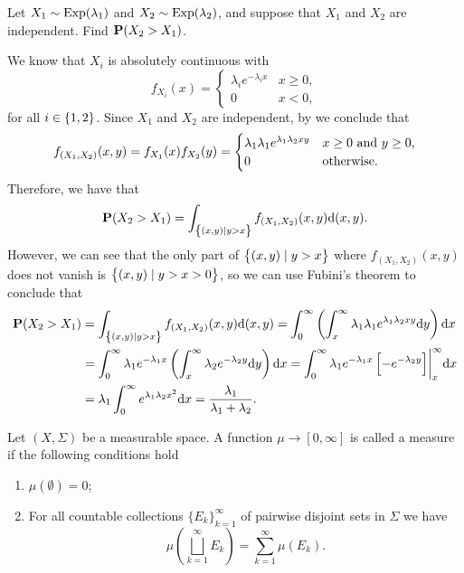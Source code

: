 \documentclass[11pt,a4paper]{article}
\begin{document}
\begin{exercise}
  Let $X_1 \sim \operatorname{Exp}(\lambda_1)$ and $X_2 \sim \operatorname{Exp}(\lambda_2)$,
  and suppose that $X_1$ and $X_2$ are independent.
  Find $\mathbf{P}(X_2 > X_1)$.
\end{exercise}
\begin{solution}
  We know that $X_i$ is absolutely continuous with
  \[
    f_{X_i}(x) =
    \begin{cases}
      \lambda_i e^{-\lambda_i x} &x \geq 0, \\
      0 &x < 0,
    \end{cases}
  \]
  for all $i \in \left\{1,2\right\}$.
  Since $X_1$ and $X_2$ are independent,
  by  we conclude that
  \[
    f_{(X_1,X_2)}(x,y) =
    f_{X_1}(x) f_{X_2}(y) =
    \begin{cases}
      \lambda_1 \lambda_1 e^{\lambda_1 \lambda_2 x y} &x \geq 0 \text{ and } y \geq 0, \\
      0 &\text{otherwise}.
    \end{cases}
  \]
  Therefore, we have that
  \[
    \mathbf{P}(X_2 > X_1) =
    \int_{\left\{(x,y) \mid y > x\right\}} f_{(X_1,X_2)}(x,y) \mathrm{d}(x,y).
  \]
  However, we can see that the only part of $\left\{(x,y) \mid y > x\right\}$
  where $f_{(X_1,X_2)}(x,y)$ does not vanish
  is $\left\{(x,y) \mid y > x > 0\right\}$,
  so we can use Fubini's theorem to conclude that
  \begin{align*}
    \Prob(X_2 > X_1) &=
    \int_{\set{(x,y) \mid y > x}} f_{(X_1,X_2)}(x,y) \dif(x,y) =
    \int_{0}^{\infty} \del{\int_{x}^{\infty} \lambda_1 \lambda_1 e^{\lambda_1 \lambda_2 x y} \dy} \dx \\ &=
    \int_{0}^{\infty} \lambda_1 e^{-\lambda_1 x} \del{\int_{x}^{\infty} \lambda_2 e^{-\lambda_2 y} \dy} \dx =
    \int_{0}^{\infty} \lambda_1 e^{-\lambda_1 x} \left[-e^{-\lambda_2 y}\right] \biggr\vert^{\infty}_{x} \dx \\ &=
    \lambda_1 \int_{0}^{\infty} e^{\lambda_1 \lambda_2 x^2} \dx =
    \frac{\lambda_1}{\lambda_1 + \lambda_2}.
  \end{align*}
\end{solution}


\begin{definition}[Measure]
  \label{def:measure}
  Let $(X, \Sigma)$ be a measurable space.
  A function $\mu \to [0,\infty]$ is called a measure if the following
  conditions hold
  \begin{enumerate}
    \item[(1)] $\mu(\emptyset) = 0$;
    \item[(2)] For all countable collections $\{E_{k}\}_{k=1}^{\infty }$ of
          pairwise disjoint sets in $\Sigma$ we have
          \[ \mu \left(\bigsqcup _{k=1}^{\infty }E_{k}\right) =
             \sum _{k=1}^{\infty }\mu (E_{k}). \]
  \end{enumerate}
\end{definition}
\end{document}
